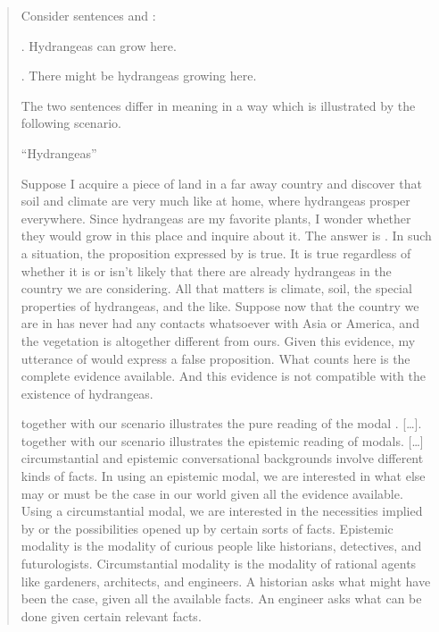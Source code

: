 \begin{quote}
	
	Consider sentences \Next and \NNext:
	
	\ex. Hydrangeas can grow here.
	
	\ex. There might be hydrangeas growing here.
	
	The two sentences differ in meaning in a way which is illustrated by the following scenario.
	
	\medskip ``Hydrangeas''
	
	\medskip Suppose I acquire a piece of land in a far away country and discover that soil and climate are very much like at home, where hydrangeas prosper everywhere. Since hydrangeas are my favorite plants, I wonder whether they would grow in this place and inquire about it. The answer is \LLast. In such a situation, the proposition expressed by \LLast is true. It is true regardless of whether it is or isn't likely that there are already hydrangeas in the country we are considering. All that matters is climate, soil, the special properties of hydrangeas, and the like. Suppose now that the country we are in has never had any contacts whatsoever with Asia or America, and the vegetation is altogether different from ours. Given this evidence, my utterance of \Last would express a false proposition. What counts here is the complete evidence available. And this evidence is not compatible with the existence of hydrangeas.
	
	\medskip \LLast together with our scenario illustrates the pure  reading of the modal . [\dots ]. \Last together with our scenario illustrates the epistemic reading of modals. [\dots] circumstantial and epistemic conversational backgrounds involve different kinds of facts. In using an epistemic modal, we are interested in what else may or must be the case in our world given all the evidence available. Using a circumstantial modal, we are interested in the necessities implied by or the possibilities opened up by certain sorts of facts. Epistemic modality is the modality of curious people like historians, detectives, and futurologists. Circumstantial modality is the modality of rational agents like gardeners, architects, and engineers. A historian asks what might have been the case, given all the available facts. An engineer asks what can be done given certain relevant facts.
\end{quote}

